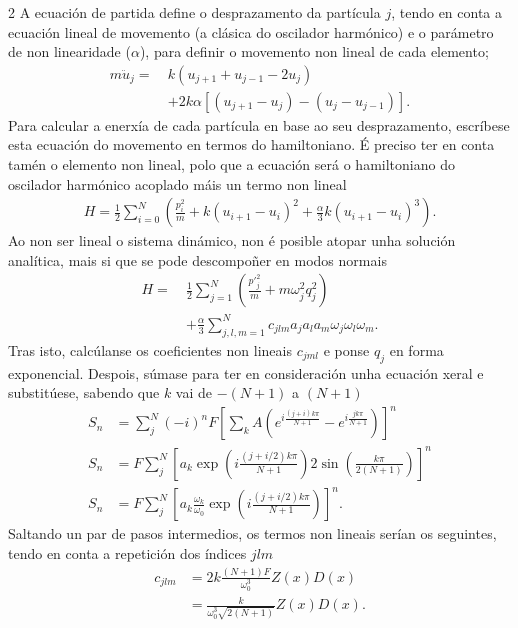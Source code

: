 \begin{multicols}{2}
A ecuación de partida define o desprazamento da partícula $j$, tendo en conta a
ecuación lineal de movemento (a clásica do oscilador harmónico) e o parámetro
de non linearidade ($\alpha$), para definir o movemento non lineal de cada
elemento;
%
\begin{align*}
    m\ddot{u}_j =\ &k(u_{j+1} + u_{j-1}-2u_j )\\
    &+ 2k\alpha [(u_{j+1} - u_j ) - (u_j - u_{j-1} )].
\end{align*}
%
Para calcular a enerxía de cada partícula en base ao seu desprazamento,
escríbese esta ecuación do movemento en termos do hamiltoniano. É preciso ter
en conta tamén o elemento non lineal, polo que a ecuación será o
hamiltoniano do oscilador harmónico acoplado máis un termo non lineal
%
\begin{align*}
    H = \frac{1}{2}\sum_{i=0}^N \left(\frac{p_i^2}{m} +
    k(u_{i+1} -u_i)^2 + \frac{\alpha}{3}k(u_{i+1} - u_i)^3\right).
\end{align*}
%
Ao non ser lineal o sistema dinámico, non é posible atopar unha solución
analítica, mais si que se pode descompoñer en modos normais
%
\begin{align*}
    H =\ &\frac{1}{2}\sum_{j=1}^N \left(\frac{{p'}_j^2}{m} +m\omega_j^2q_j^2\right) \\
    &+\frac{\alpha}{3}\sum_{j,l,m=1}^N c_{jlm}a_ja_la_m\omega_j\omega_l\omega_m.
\end{align*}
%
Tras isto, calcúlanse os coeficientes non lineais $c_{jml}$ e ponse $q_j$ en
forma exponencial. Despois, súmase para ter en consideración unha ecuación
xeral e substitúese, sabendo que $k$ vai de $-(N+1)$ a $(N+1)$
%
\begin{align*}
    S_n &= \sum_j^N(-i)^nF\left[\sum_k A\left(e^{i\frac{(j+i)k\pi}{N+1}}-e^{i\frac{jk\pi}{N+1}}\right)\right]^n\\
    S_n &= F\sum_j^N\left[a_k\exp\left(i\frac{(j+i/2)k\pi}{N+1}\right)2\sin\left(\frac{k\pi}{2(N+1)}\right)\right]^n\\
    S_n &= F\sum_j^N\left[a_k\frac{\omega_k}{\omega_0}\exp\left(i\frac{(j+i/2)k\pi}{N+1}\right)\right]^n.
\end{align*}
%
Saltando un par de pasos intermedios, os termos non lineais serían os
seguintes, tendo en conta a repetición dos índices $jlm$
%
\begin{align*}
    c_{jlm} &= 2k\frac{(N+1)F}{\omega_0^3}Z(x)D(x) \\
            &=\frac{k}{\omega_0^3\sqrt{2(N+1)}}Z(x)D(x).
\end{align*}

\end{multicols}
